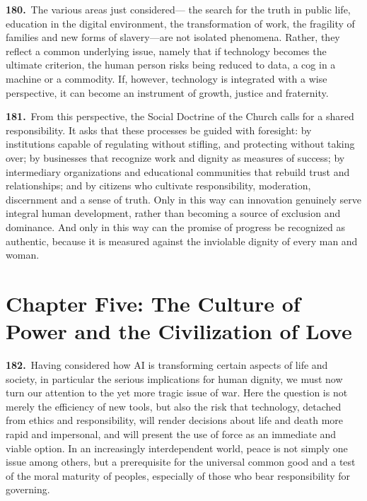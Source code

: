 \documentclass{article}
\begin{document}
\textbf{180.}\ The various areas just considered--- the search for the truth in public life, education in the digital environment, the transformation of work, the fragility of families and new forms of slavery---are not isolated phenomena. Rather, they reflect a common underlying issue, namely that if technology becomes the ultimate criterion, the human person risks being reduced to data, a cog in a machine or a commodity. If, however, technology is integrated with a wise perspective, it can become an instrument of growth, justice and fraternity.

\textbf{181.}\ From this perspective, the Social Doctrine of the Church calls for a shared responsibility. It asks that these processes be guided with foresight: by institutions capable of regulating without stifling, and protecting without taking over; by businesses that recognize work and dignity as measures of success; by intermediary organizations and educational communities that rebuild trust and relationships; and by citizens who cultivate responsibility, moderation, discernment and a sense of truth. Only in this way can innovation genuinely serve integral human development, rather than becoming a source of exclusion and dominance. And only in this way can the promise of progress be recognized as authentic, because it is measured against the inviolable dignity of every man and woman.

\section{Chapter Five: The Culture of Power and the Civilization of Love}

\textbf{182.}\ Having considered how AI is transforming certain aspects of life and society, in particular the serious implications for human dignity, we must now turn our attention to the yet more tragic issue of war. Here the question is not merely the efficiency of new tools, but also the risk that technology, detached from ethics and responsibility, will render decisions about life and death more rapid and impersonal, and will present the use of force as an immediate and viable option. In an increasingly interdependent world, peace is not simply one issue among others, but a prerequisite for the universal common good and a test of the moral maturity of peoples, especially of those who bear responsibility for governing.
\end{document}
